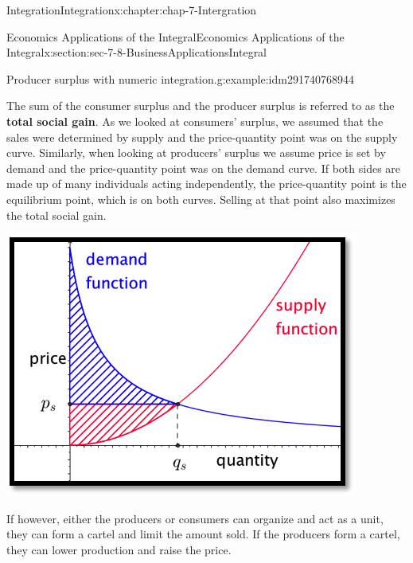 \documentclass[oneside,10pt,]{book}
\newcommand{\terminology}[1]{\textbf{#1}}
\numberwithin{equation}{section}
\begin{document}
\begin{chapterptx}{Integration}{}{Integration}{}{}{x:chapter:chap-7-Intergration}
\begin{sectionptx}{Economics Applications of the Integral}{}{Economics Applications of the Integral}{}{}{x:section:sec-7-8-BusinessApplicationsIntegral}
\begin{example}{Producer surplus with numeric integration.}{g:example:idm291740768944}
\begin{sidebyside}{1}{0.3}{0.3}{0}
\begin{sbspanel}{0.4}
\end{sbspanel}%
\end{sidebyside}%
\end{example}
The sum of the consumer surplus and the producer surplus is referred to as the \terminology{total social gain}.   As we looked at consumers' surplus, we assumed that the sales were determined by supply and the price-quantity point was on the supply curve.  Similarly, when looking at producers' surplus we assume price is set by demand and the price-quantity point was on the demand curve.  If both sides are made up of many individuals acting independently, the price-quantity point is the equilibrium point, which is on both curves.  Selling at that point also maximizes the total social gain.%
\begin{sidebyside}{1}{0.2}{0.2}{0}%
\begin{sbspanel}{0.6}%
\includegraphics[width=\linewidth]{images/sec7-8-8.png}
\end{sbspanel}%
\end{sidebyside}%
\par
If however, either the producers or consumers can organize and act as a unit, they can form a cartel and limit the amount sold.  If the producers form a cartel, they can lower production and raise the price.%
\begin{sidebyside}{1}{0.2}{0.2}{0}%
\begin{sbspanel}{0.6}%

\end{sbspanel}
\end{sidebyside}
\end{sectionptx}
\end{chapterptx}
\end{document}
